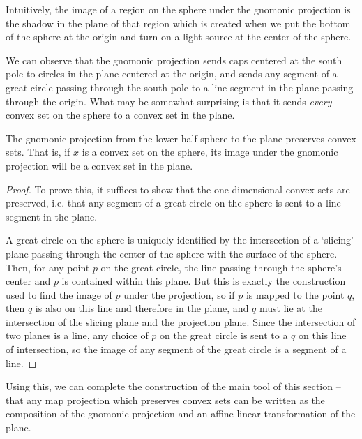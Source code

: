   Intuitively, the image of a region on the sphere under the gnomonic
  projection is the shadow in the plane of that region which is
  created when we put the bottom of the sphere at the origin and turn
  on a light source at the center of the sphere.


We can observe that the gnomonic projection sends caps centered at the
south pole to circles in the plane centered at the origin, and sends
any segment of a great circle passing through the south pole to a line
segment in the plane passing through the origin.  What may be somewhat
surprising is that it sends \textit{every} convex set on the sphere to
a convex set in the plane.


\begin{lemma}
The gnomonic projection from the lower half-sphere to the plane
preserves convex sets.  That is, if $x$ is a convex set on the sphere,
its image under the gnomonic projection will be a convex set in the
plane.
\end{lemma}
\begin{proof}

To prove this, it suffices to show that the one-dimensional convex
sets are preserved, i.e. that any segment of a great circle on the
sphere is sent to a line segment in the plane.

A great circle on the sphere is uniquely identified by the
intersection of a `slicing' plane passing through the center of the
sphere with the surface of the sphere.  Then, for any point $p$ on the
great circle, the line passing through the sphere's center and $p$ is
contained within this plane.  But this is exactly the construction
used to find the image of $p$ under the projection, so if $p$ is
mapped to the point $q$, then $q$ is also on this line and therefore
in the plane, and $q$ must lie at the intersection of the slicing
plane and the projection plane.  Since the intersection of two planes
is a line, any choice of $p$ on the great circle is sent to a $q$ on
this line of intersection, so the image of any segment of the great
circle is a segment of a line.
\end{proof}

Using this, we can complete the construction of the main tool of this
section -- that any map projection which preserves convex sets can be
written as the composition of the gnomonic projection and an affine
linear transformation of the plane.


